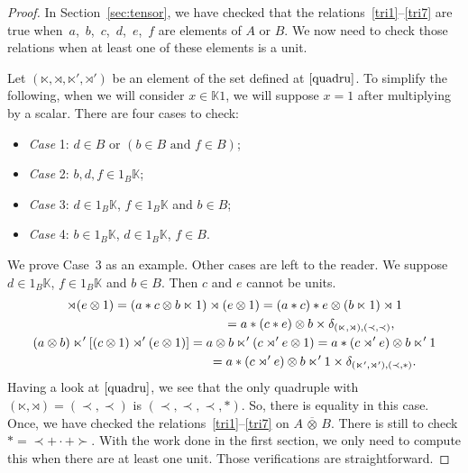 \documentclass[pdftex]{sigma}
\numberwithin{equation}{section}
\theoremstyle{definition}
\theoremstyle{plain}
\newcommand{\K}{\mathbb{K}}
\begin{document}
\begin{proof}
In Section~\ref{sec:tensor}, we have checked that the relations~\eqref{tri1}--\eqref{tri7} are true when~$a$,~$b$,~$c$,~$d$,~$e$,~$f$ are elements of $A$ or $B$. We now need to check those relations when at least one of these elements is a unit.

Let $(\ltimes,\rtimes,\ltimes',\rtimes')$ be an element of the set defined at $\eqref{quadru}$.
To simplify the following, when we will consider $x\in\K 1$, we will suppose $x=1$ after multiplying by a scalar. There are four cases to check:
\begin{itemize}\itemsep=0pt
	\item \textit{Case} 1: $d\in B$ or $(b\in B \text{ and } f\in B)$;
	\item \textit{Case} 2: $b,d,f\in 1_B\K$;
	\item \textit{Case} 3: $d\in 1_B\K$, $f\in 1_B\K$ and $b\in B$;
	\item\textit{Case} 4: $b\in1_B\K$, $d\in1_B\K$, $f\in B$.
\end{itemize}
We prove Case~3 as an example. Other cases are left to the reader. We suppose $d\in 1_B\K$, $f\in 1_B\K$ and $b\in B$.
Then $c$ and $e$ cannot be units.
\begin{gather*}
	[(a\otimes b)\ltimes (c\otimes 1)]\rtimes (e\otimes 1) =(a*c\otimes b\ltimes 1)\rtimes (e\otimes 1)
	 =(a*c)*e\otimes (b\ltimes 1)\rtimes 1 \\
\hphantom{[(a\otimes b)\ltimes (c\otimes 1)]\rtimes (e\otimes 1)}{}=a*(c*e)\otimes b \times \delta_{(\ltimes,\rtimes),(\prec,\prec)}, \\
	(a\otimes b)\ltimes'[(c\otimes 1)\rtimes' (e\otimes 1)]
	 = a\otimes b\ltimes'(c\rtimes' e\otimes 1)
	 =a*(c\rtimes' e)\otimes b\ltimes' 1 \\
	\hphantom{(a\otimes b)\ltimes'[(c\otimes 1)\rtimes' (e\otimes 1)]}{} =a*(c\rtimes' e)\otimes b\ltimes' 1 \times \delta_{(\ltimes',\rtimes'),(\prec,*)}.
\end{gather*}
Having a look at $\eqref{quadru}$, we see that the only quadruple with $(\ltimes,\rtimes)=(\prec,\prec)$ is $(\prec,\prec,\prec,*)$. So, there is equality in this case.
Once, we have checked the relations~\eqref{tri1}--\eqref{tri7} on $A\,\overline{\otimes}\, B$.
There is still to check $*=\prec +\cdot +\succ$. With the work done in the first section, we only need to compute this when there are at least one unit. Those verifications are straightforward.
\end{proof}
\end{document}
